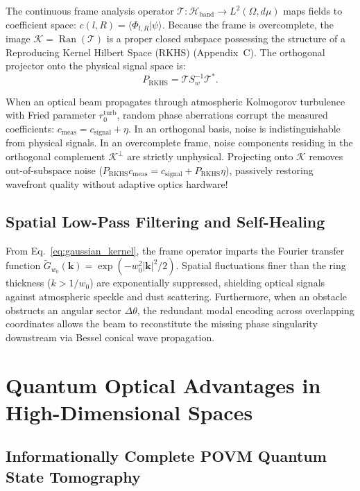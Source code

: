 \documentclass[11pt,a4paper]{article}
\begin{document}
The continuous frame analysis operator $\mathcal{T}: \mathcal{H}_{\text{band}} \to L^2(\Omega, d\mu)$ maps fields to coefficient space: $c(l, R) = \langle \Phi_{l, R} | \psi \rangle$. Because the frame is overcomplete, the image $\mathcal{K} = \operatorname{Ran}(\mathcal{T})$ is a proper closed subspace possessing the structure of a Reproducing Kernel Hilbert Space (RKHS) (Appendix~C). The orthogonal projector onto the physical signal space is:
\begin{equation}
\boxed{P_{\text{RKHS}} = \mathcal{T} S_w^{-1} \mathcal{T}^*.}
\end{equation}

When an optical beam propagates through atmospheric Kolmogorov turbulence with Fried parameter $r_0^{\text{turb}}$, random phase aberrations corrupt the measured coefficients: $c_{\text{meas}} = c_{\text{signal}} + \eta$. In an orthogonal basis, noise is indistinguishable from physical signals. In an overcomplete frame, noise components residing in the orthogonal complement $\mathcal{K}^\perp$ are strictly unphysical. Projecting onto $\mathcal{K}$ removes out-of-subspace noise ($P_{\text{RKHS}} c_{\text{meas}} = c_{\text{signal}} + P_{\text{RKHS}} \eta$), passively restoring wavefront quality without adaptive optics hardware!

\subsection{Spatial Low-Pass Filtering and Self-Healing}

From Eq.~\eqref{eq:gaussian_kernel}, the frame operator imparts the Fourier transfer function $\widetilde{G}_{w_0}(\mathbf{k}) = \exp(-w_0^2 |\mathbf{k}|^2 / 2)$. Spatial fluctuations finer than the ring thickness ($k > 1/w_0$) are exponentially suppressed, shielding optical signals against atmospheric speckle and dust scattering. Furthermore, when an obstacle obstructs an angular sector $\Delta \theta$, the redundant modal encoding across overlapping coordinates allows the beam to reconstitute the missing phase singularity downstream via Bessel conical wave propagation.

\section{Quantum Optical Advantages in High-Dimensional Spaces}
\label{sec:quantum_advantages}

\subsection{Informationally Complete POVM Quantum State Tomography}
\end{document}
